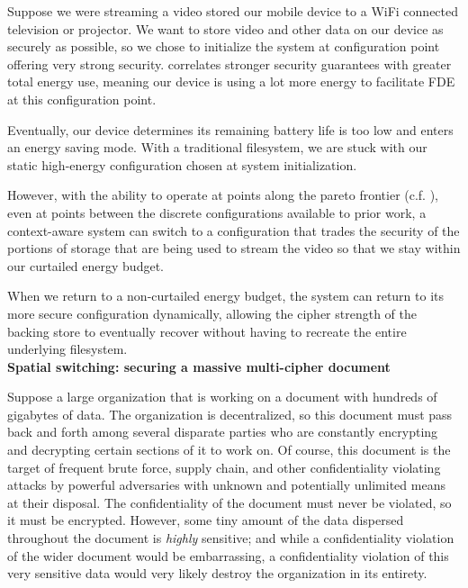 Suppose we were streaming a video stored our mobile device to a WiFi connected
television or projector. We want to store video and other data on our device as
securely as possible, so we chose to initialize the system at configuration
point offering very strong security. 
correlates stronger security guarantees with greater total energy use, meaning
our device is using a lot more energy to facilitate FDE at this configuration
point.

Eventually, our device determines its remaining battery life is too low and
enters an energy saving mode. With a traditional filesystem, we are stuck with
our static high-energy configuration chosen at system initialization.

However, with the ability to operate at points along the pareto frontier (c.f.
), even at points between the discrete
configurations available to prior work, a context-aware system can switch to a
configuration that trades the security of the portions of storage that are being
used to stream the video so that we stay within our curtailed energy budget.

When we return to a non-curtailed energy budget, the system can return to its
more secure configuration dynamically, allowing the cipher strength of the
backing store to eventually recover without having to recreate the entire
underlying filesystem.\\

\noindent
\textbf{Spatial switching: securing a massive multi-cipher document}


Suppose a large organization that is working on a document with hundreds of
gigabytes of data. The organization is decentralized, so this document must pass
back and forth among several disparate parties who are constantly encrypting and
decrypting certain sections of it to work on. Of course, this document is the
target of frequent brute force, supply chain, and other confidentiality
violating attacks by powerful adversaries with unknown and potentially unlimited
means at their disposal. The confidentiality of the document must never be
violated, so it must be encrypted. However, some tiny amount of the data
dispersed throughout the document is \emph{highly} sensitive; and while a
confidentiality violation of the wider document would be embarrassing, a
confidentiality violation of this very sensitive data would very likely destroy
the organization in its entirety.


